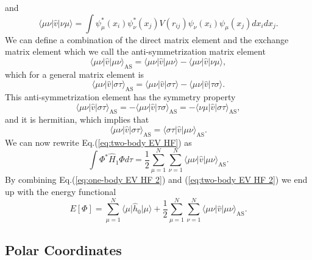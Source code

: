 \documentclass[../main.tex]{subfiles}
\begin{document}
and 
\begin{equation}
    \langle \mu \nu \vert \hat{v} \vert \nu \mu \rangle = \int \psi_\mu^*(x_i) \psi_\nu^*(x_j) V(r_{ij}) \psi_\nu(x_i) \psi_\mu(x_j) dx_i dx_j.
\end{equation}
We can define a combination of the direct matrix element and the exchange matrix element which we call the anti-symmetrization matrix element
\begin{equation}
    \langle \mu \nu \vert \hat{v} \vert \mu \nu \rangle_{\textrm{AS}} = \langle \mu \nu \vert \hat{v} \vert \mu \nu \rangle - \langle \mu \nu \vert \hat{v} \vert \nu \mu \rangle,
\end{equation}
which for a general matrix element is 
\begin{equation}
    \langle \mu \nu \vert \hat{v} \vert \sigma \tau \rangle_{\textrm{AS}} = \langle \mu \nu \vert \hat{v} \vert \sigma \tau \rangle - \langle \mu \nu \vert \hat{v} \vert \tau \sigma \rangle.
\end{equation}
This anti-symmetrization element has the symmetry property
\begin{equation}
    \langle \mu \nu \vert \hat{v} \vert \sigma \tau \rangle_{\textrm{AS}} = -\langle \mu \nu \vert \hat{v} \vert \tau \sigma \rangle_{\textrm{AS}} = -\langle \nu \mu \vert \hat{v} \vert \sigma \tau \rangle_{\textrm{AS}},
\end{equation}
and it is hermitian, which implies that 
\begin{equation}
    \langle \mu \nu \vert \hat{v} \vert \sigma \tau \rangle_{\textrm{AS}} = \langle \sigma \tau \vert \hat{v} \vert \mu \nu \rangle_{\textrm{AS}}.
\end{equation}
We can now rewrite Eq.(\ref{eq:two-body EV HF}) as 
\begin{equation}\label{eq:two-body EV HF 2}
    \int \Phi^* \hat{H}_1 \Phi d\tau = \frac{1}{2} \sum_{\mu=1}^N \sum_{\nu=1}^N \langle \mu \nu \vert \hat{v} \vert \mu \nu \rangle_{\textrm{AS}}.
\end{equation}
By combining Eq.(\ref{eq:one-body EV HF 2}) and (\ref{eq:two-body EV HF 2}) we end up with the energy functional 
\begin{equation}
    E\left[ \Phi \right] = \sum_{\mu=1}^N \langle \mu \vert \hat{h}_0 \vert \mu \rangle + \frac{1}{2} \sum_{\mu=1}^N \sum_{\nu=1}^N \langle \mu \nu \vert \hat{v} \vert \mu \nu \rangle_{\textrm{AS}}.
\end{equation}

\subsection{Polar Coordinates}
\end{document}

